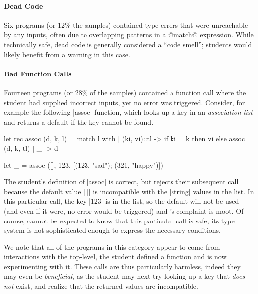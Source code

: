 \paragraph{Dead Code}
%
Six programs (or 12\% the samples) contained type errors that were
unreachable by any inputs, often due to overlapping patterns in a
@match@ expression.
%
While technically safe, dead code is generally considered a ``code
smell''; students would likely benefit from a warning in this case.

\paragraph{Bad Function Calls}
Fourteen programs (or 28\% of the samples) contained a function call
where the student had supplied incorrect inputs, yet no error was
triggered.
%
Consider, for example the following |assoc| function, which
looks up a key in an \emph{association list} and returns a default if
the key cannot be found.
%
\begin{code}
  let rec assoc (d, k, l) = match l with
    | (ki, vi)::tl ->
       if ki = k then
         vi
       else
         assoc (d, k, tl)
    | _ -> d

  let _ = assoc ([], 123, [(123, "sad"); (321, "happy")])
\end{code}
%
The student's definition of |assoc| is correct, but \ocaml rejects their
subsequent call because the default value |[]| is incompatible with the
|string| values in the list.
%
In this particular call, the key |123| is in the list, so the default
will not be used (and even if it were, no error would be triggered) and
\ocaml's complaint is moot.
%
Of course, \ocaml cannot be expected to know that this particular call
is safe, its type system is not sophisticated enough to express the
necessary conditions.

We note that all of the programs in this category appear to come from
interactions with the \ocaml top-level, \ie the student defined a
function and is now experimenting with it.
%
These calls are thus particularly harmless, indeed they may even be
\emph{beneficial}, as the student may next try looking up a key that
\emph{does not} exist, and realize that the returned values are
incompatible.


